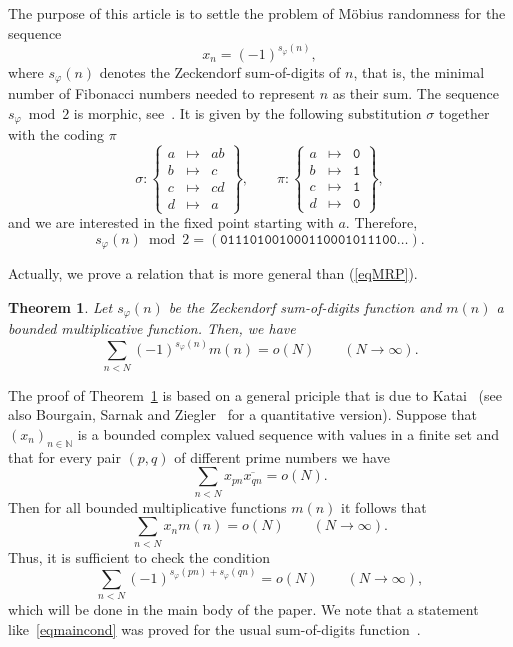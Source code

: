 \documentclass[12pt]{amsart}
\newtheorem{theorem}{Theorem}
\begin{document}
The purpose of this article is to settle the problem of M\"obius randomness for the sequence
\[
x_n = (-1)^{s_\varphi(n)},
\]
where $s_\varphi(n)$ denotes the Zeckendorf sum-of-digits of $n$, that is,
the minimal number of Fibonacci numbers needed to represent $n$ as their sum.
The sequence $s_\varphi\bmod 2$ is morphic, see~\cite[p. 14]{Bruyere}.
It is given by the following substitution $\sigma$ together with the coding $\pi$
\[
\sigma:\left\{\begin{array}{lll}
a&\mapsto&ab\\b&\mapsto&c\\c&\mapsto& cd\\d&\mapsto&a\end{array}\right\},
\qquad
\pi:\left\{\begin{array}{lll}a&\mapsto&{\mathtt{0}}\\b&\mapsto&{\mathtt{1}}\\c&\mapsto&{\mathtt{1}}\\d&\mapsto&{\mathtt{0}}\end{array}\right\},
\]
and we are interested in the fixed point starting with $a$.
Therefore,
\[
s_\varphi(n) \bmod 2=\left({\mathtt{0}}{\mathtt{1}}{\mathtt{1}}{\mathtt{1}}{\mathtt{0}}{\mathtt{1}}{\mathtt{0}}{\mathtt{0}}{\mathtt{1}}{\mathtt{0}}{\mathtt{0}}{\mathtt{0}}{\mathtt{1}}{\mathtt{1}}{\mathtt{0}}{\mathtt{0}}{\mathtt{0}}{\mathtt{1}}{\mathtt{0}}{\mathtt{1}}{\mathtt{1}}{\mathtt{1}}{\mathtt{0}}{\mathtt{0}}\ldots\right).
\]

Actually, we prove a relation that is more general than (\ref{eqMRP}).
\begin{theorem}\label{Thmain}
Let $s_\varphi(n)$ be the Zeckendorf sum-of-digits function and $m(n)$ a bounded multiplicative function.
Then, we have
\begin{equation}\label{eqThmain}
\sum_{n<N} (-1)^{s_\varphi(n)} m(n) = o(N) \qquad (N\to\infty).
\end{equation}
\end{theorem}

The proof of Theorem~\ref{Thmain} is based on a general priciple that is due to 
Katai~\cite{Katai1986} (see also Bourgain, Sarnak and Ziegler~\cite{BSZ2013} for a quantitative version).
Suppose that $(x_n)_{n\in\mathbb{N}}$ is a bounded complex valued sequence with values in a finite set and that for every pair $(p,q)$ of different prime numbers we have
\[
\sum_{n< N} x_{pn} \overline {x_{qn}} = o(N).
\]
Then for all bounded multiplicative functions $m(n)$ it follows that 
\[
\sum_{n< N} x_n m(n) = o(N) \qquad (N\to\infty).
\]
Thus, it is sufficient to check the condition
\begin{equation}\label{eqmaincond}
\sum_{n< N} (-1)^{s_\varphi(pn)+s_\varphi(qn)} = o(N) \qquad (N\to\infty),
\end{equation}
which will be done in the main body of the paper.
We note that a statement like~\eqref{eqmaincond} was proved for the usual sum-of-digits function~\cite{Coquet1983,DT2005,Solinas1989}.
\end{document}
